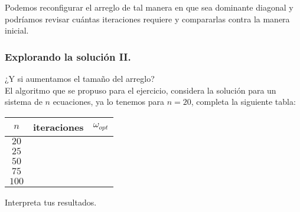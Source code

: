 \begin{frame}
Podemos reconfigurar el arreglo de tal manera en que sea dominante diagonal y podríamos revisar cuántas iteraciones requiere y compararlas contra la manera inicial.
\end{frame}
\begin{frame}
\frametitle{Explorando la solución II.}
¿Y si aumentamos el tamaño del arreglo?
\\
\medskip
El algoritmo que se propuso para el ejercicio, considera la solución para un sistema de $n$ ecuaciones, ya lo tenemos para $n=20$, completa la siguiente tabla:
\end{frame}
\begin{frame}
\begin{center}
\begin{tabular}{c | c | c }
\hline
$n$ & iteraciones & $\omega_{opt}$ \\ \hline
$20$ & & \\ \hline
$25$ & & \\ \hline
$50$ & & \\ \hline
$75$ & & \\ \hline
$100$ & & \\ \hline
\end{tabular}
\end{center}
Interpreta tus resultados.
\end{frame}
